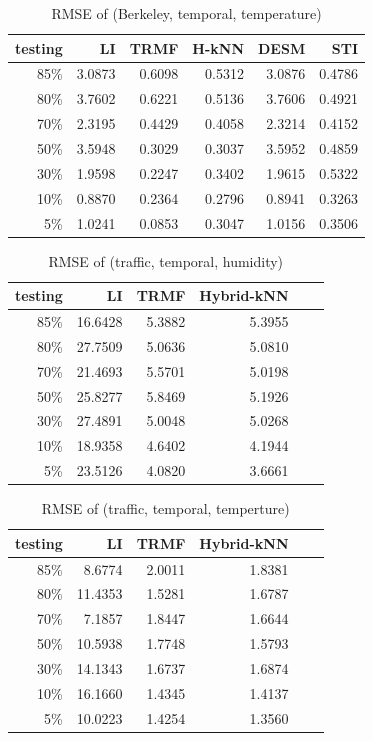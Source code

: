 \begin{table}[htbp]
\centering
\caption{RMSE of (Berkeley, temporal, temperature)}
\label{table:berkeley_temporal_tem}
\begin{tabular}{ r | r r r r r}
	testing	&LI	&TRMF	&H-kNN	&DESM	&STI\\ \hline
	85\%	&3.0873	&0.6098	&0.5312	&3.0876	&0.4786\\ 
	80\%	&3.7602	&0.6221	&0.5136	&3.7606	&0.4921\\
	70\%	&2.3195	&0.4429	&0.4058	&2.3214	&0.4152\\
	50\%	&3.5948	&0.3029	&0.3037	&3.5952	&0.4859\\
	30\%	&1.9598	&0.2247	&0.3402	&1.9615	&0.5322\\
	10\%	&0.8870	&0.2364	&0.2796	&0.8941	&0.3263\\
	 5\%	&1.0241	&0.0853	&0.3047	&1.0156	&0.3506\\
\end{tabular}
\end{table}

\begin{table} [htbp]
\centering
\caption{RMSE of (traffic, temporal, humidity)}
\label{table:traffic_temporal_hum}
\begin{tabular}{ r | r r r r r}
	testing	&LI	&TRMF	&Hybrid-kNN \\ \hline
	85\%	&16.6428	&5.3882	&5.3955\\ 
	80\%	&27.7509	&5.0636	&5.0810\\
	70\%	&21.4693	&5.5701	&5.0198\\
	50\%	&25.8277	&5.8469	&5.1926\\
	30\%	&27.4891	&5.0048	&5.0268\\
	10\%	&18.9358	&4.6402	&4.1944\\
	 5\%	&23.5126	&4.0820	&3.6661\\
\end{tabular}
\end{table}


\begin{table} [htbp]
\centering
\caption{RMSE of (traffic, temporal, temperture)}
\label{table:traffic_temporal_tem}
\begin{tabular}{ r | r r r r r}
	testing	&LI	&TRMF	&Hybrid-kNN \\ \hline
	85\%	& 8.6774	&2.0011	&1.8381\\ 
	80\%	&11.4353	&1.5281	&1.6787\\
	70\%	& 7.1857	&1.8447	&1.6644\\
	50\%	&10.5938	&1.7748	&1.5793\\
	30\%	&14.1343	&1.6737	&1.6874\\
	10\%	&16.1660	&1.4345	&1.4137\\
	 5\%	&10.0223	&1.4254	&1.3560\\
\end{tabular}
\end{table}

